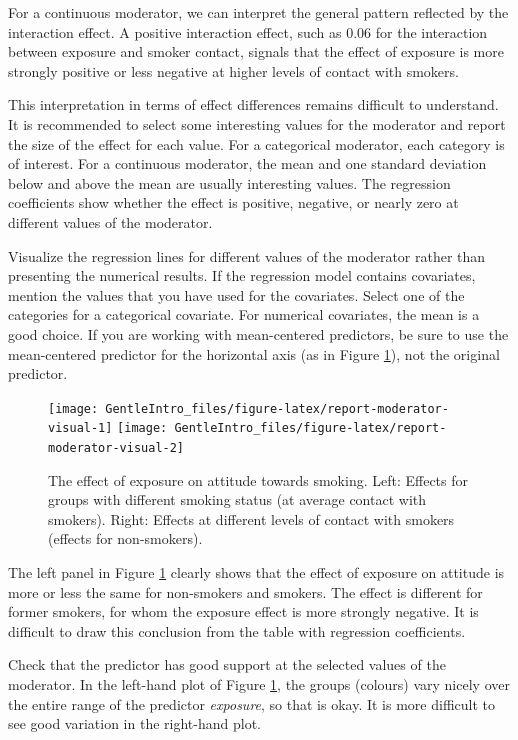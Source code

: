 \documentclass[a4paper]{book}
\theoremstyle{definition}
\theoremstyle{definition}
\theoremstyle{definition}
\theoremstyle{remark}
\begin{document}
For a continuous moderator, we can interpret the general pattern
reflected by the interaction effect. A positive interaction effect, such
as 0.06 for the interaction between exposure and smoker contact, signals
that the effect of exposure is more strongly positive or less negative
at higher levels of contact with smokers.

This interpretation in terms of effect differences remains difficult to
understand. It is recommended to select some interesting values for the
moderator and report the size of the effect for each value. For a
categorical moderator, each category is of interest. For a continuous
moderator, the mean and one standard deviation below and above the mean
are usually interesting values. The regression coefficients show whether
the effect is positive, negative, or nearly zero at different values of
the moderator.

Visualize the regression lines for different values of the moderator
rather than presenting the numerical results. If the regression model
contains covariates, mention the values that you have used for the
covariates. Select one of the categories for a categorical covariate.
For numerical covariates, the mean is a good choice. If you are working
with mean-centered predictors, be sure to use the mean-centered
predictor for the horizontal axis (as in Figure
\ref{fig:report-moderator-visual}), not the original predictor.

\begin{figure}
\texttt{[image: GentleIntro\_files/figure-latex/report-moderator-visual-1]} \texttt{[image: GentleIntro\_files/figure-latex/report-moderator-visual-2]} \caption{The effect of exposure on attitude towards smoking. Left: Effects for groups with different smoking status (at average contact with smokers). Right: Effects at different levels of contact with smokers (effects for non-smokers).}\label{fig:report-moderator-visual}
\end{figure}

The left panel in Figure \ref{fig:report-moderator-visual} clearly shows
that the effect of exposure on attitude is more or less the same for
non-smokers and smokers. The effect is different for former smokers, for
whom the exposure effect is more strongly negative. It is difficult to
draw this conclusion from the table with regression coefficients.

Check that the predictor has good support at the selected values of the
moderator. In the left-hand plot of Figure
\ref{fig:report-moderator-visual}, the groups (colours) vary nicely over
the entire range of the predictor \emph{exposure}, so that is okay. It
is more difficult to see good variation in the right-hand plot.
\end{document}
